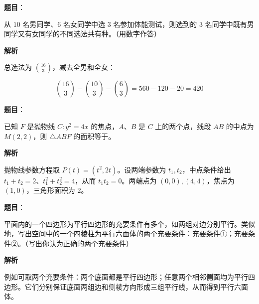 \begin{answer}

\textbf{题目}：

从 $10$ 名男同学、$6$ 名女同学中选 $3$ 名参加体能测试，则选到的 $3$ 名同学中既有男同学又有女同学的不同选法共有\gkblank{}种。（用数字作答）

\textbf{解析}

总选法为 $\binom{16}{3}$，减去全男和全女：

\nopagebreak[4]
\[
\binom{16}{3}-\binom{10}{3}-\binom63=560-120-20=420
\]


\end{answer}
\begin{answer}

\textbf{题目}：

已知 $F$ 是抛物线 $C:y^2=4x$ 的焦点，$A\text{、}B$ 是 $C$ 上的两个点，线段 $AB$ 的中点为 $M(2,2)$，则 $\triangle ABF$ 的面积等于\gkblank{}。

\textbf{解析}

抛物线参数方程取 $P(t)=(t^2,2t)$。设两端参数为 $t_1,t_2$，中点条件给出 $t_1+t_2=2$、$t_1^2+t_2^2=4$，从而 $t_1t_2=0$。两端点为 $(0,0),(4,4)$，焦点为 $(1,0)$，三角形面积为 $2$。


\end{answer}
\begin{answer}

\textbf{题目}：

平面内的一个四边形为平行四边形的充要条件有多个，如两组对边分别平行。类似地，写出空间中的一个四棱柱为平行六面体的两个充要条件：充要条件①\gkblank{}；充要条件②\gkblank{}。（写出你认为正确的两个充要条件）

\textbf{解析}

例如可取两个充要条件：两个底面都是平行四边形；任意两个相邻侧面均为平行四边形。它们分别保证底面两组边和侧棱方向形成三组平行线，从而得到平行六面体。


\end{answer}
